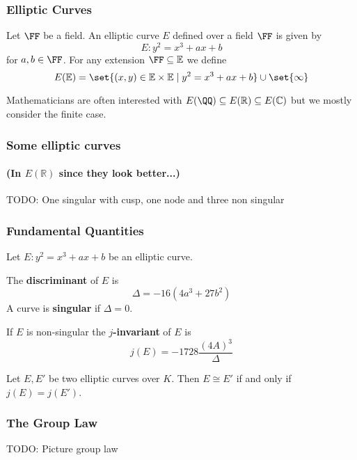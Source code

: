 \documentclass{beamer}
\begin{document}
\begin{frame}
    \frametitle{Elliptic Curves}
    \begin{definition}
        Let $\FF$ be a field. An elliptic curve $E$ defined over a field $\FF$ is given by 
        \[ E: y^2 = x^3 + a x + b \]
        for $a, b \in \FF$. For any extension $\FF \subseteq \mathbb{E}$ we define
        \[ E(\mathbb{E}) = \set{(x, y) \in \mathbb{E} \times \mathbb{E} \mid y^2 = x^3 + a x + b } \cup \set{ \infty } \]
    \end{definition}
    Mathematicians are often interested with $E(\QQ) \subseteq E(\mathbb{R}) \subseteq E(\mathbb{C})$ but we mostly consider the finite case.
\end{frame}

\begin{frame}
    \frametitle{Some elliptic curves}
    \framesubtitle{(In $E(\mathbb{R})$ since they look better...)}
    TODO: One singular with cusp, one node and three non singular
\end{frame}

\begin{frame}
    \frametitle{Fundamental Quantities}
    \begin{definition}
        Let $E: y^2 = x^3 + a x + b$ be an elliptic curve.

        The \textbf{discriminant} of $E$ is 
            \[ \Delta = -16 (4 a^3 + 27 b^2) \] 
        A curve is \textbf{singular} if $\Delta = 0$.

        If $E$ is non-singular the $j$\textbf{-invariant} of $E$ is
            \[ j(E) = -1728 \frac{(4 A)^3}{\Delta} \]
    \end{definition}
    \begin{theorem}
        Let $E, E'$ be two elliptic curves over $K$. Then $E \cong E'$ if and only if $j(E) = j(E')$. 
    \end{theorem}
\end{frame}

\begin{frame}
    \frametitle{The Group Law} 
    TODO: Picture group law
\end{frame}
\end{document}
